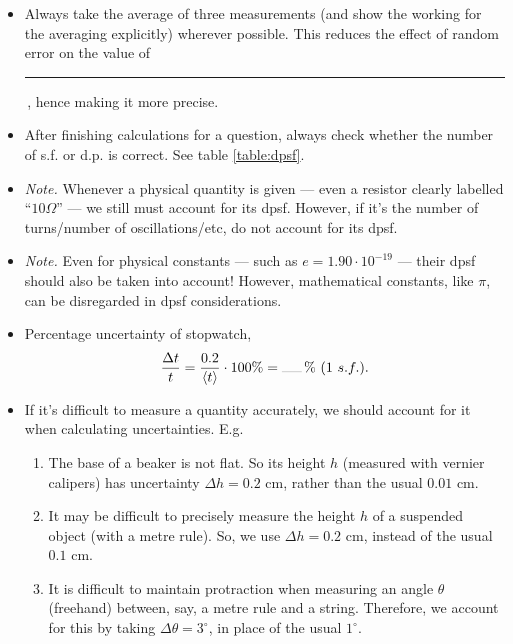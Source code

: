 \documentclass[oneside]{book}
\begin{document}
\begin{itemize}
\begin{table}[H]
\begin{tabular}{|Sc|Sc|}
            \hline
            \(Z=aX\pm bY\) & \(\Delta Z=\lvert a \rvert\Delta X+\lvert b \rvert\Delta Y\)\\
            \hline
            \(Z=cX^aY^b\) & \(\dfrac{\Delta Z}{Z}=\lvert a \rvert\dfrac{\Delta X}{X}+\lvert b \rvert\dfrac{\Delta Y}{Y}\)\\
            \hline
        \end{tabular}
        \caption{Uncertainty rules}
        \label{table:uncertainty-rules}
    \end{table}
    \item Always take the average of three measurements (and show the working for the averaging explicitly) wherever possible. This reduces the effect of random error on the value of \rule{0.5cm}{0.05mm}\,, hence making it more precise.
    \item After finishing calculations for a question, always check whether the number of s.f. or d.p. is correct. See table \ref{table:dpsf}.
    \item \emph{Note.} Whenever a physical quantity is given --- even a resistor clearly labelled ``\(10\Omega\)'' --- we still must account for its dpsf. However, if it's the number of turns/number of oscillations/etc, do not account for its dpsf.
    \item \emph{Note.} Even for physical constants --- such as \(e=1.90\cdot 10^{-19}\) --- their dpsf should also be taken into account! However, mathematical constants, like \(\pi\), can be disregarded in dpsf considerations. 
    \item Percentage uncertainty of stopwatch,
    \[\frac{\Delta t}{t}=\frac{0.2}{\langle t \rangle}\cdot 100\%=\rule{0.5cm}{0.05mm}\,\%\ (1\ s.f.).\]
    \item If it's difficult to measure a quantity accurately, we should account for it when calculating uncertainties. E.g. 
    \begin{enumerate}
        \item The base of a beaker is not flat. So its height \(h\) (measured with vernier calipers) has uncertainty \(\Delta h=0.2\) cm, rather than the usual \(0.01\) cm.
        \item It may be difficult to precisely measure the height \(h\) of a suspended object (with a metre rule). So, we use \(\Delta h=0.2\) cm, instead of the usual \(0.1\) cm. 
        \item It is difficult to maintain protraction when measuring an angle \(\theta\) (freehand) between, say, a metre rule and a string. Therefore, we account for this by taking \(\Delta\theta=3^\circ\), in place of the usual \(1^\circ\).
    \end{enumerate}
\end{itemize}
\end{document}
